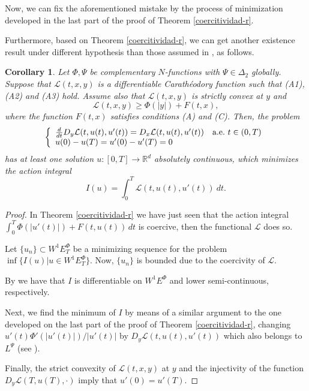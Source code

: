 \documentclass[twoside]{article}
\newtheorem{cor}[thm]{Corollary}
\theoremstyle{remark}
\newcommand{\lpsi}{L^{\Psi}}
\newcommand{\ephi}{E^{\Phi}}
\newcommand{\wphiet}{W^{1}\ephi_T}
\newcommand{\wphie}{W^{1}\ephi}
\newcommand{\rr}{\mathbb{R}}
\renewcommand{\geq}{\geqslant}
\begin{document}
Now, we can fix the aforementioned mistake by the process of minimization developed 
in the last part of the proof of Theorem \ref{coercitividad-r}.

Furthermore, based on Theorem \ref{coercitividad-r},
we can get another existence result under different hypothesis  than those assumed in \cite[Thm. 6.2]{ABGMS2015}, as follows.


\begin{cor}
Let $\Phi,\Psi$ be complementary $N$-functions with $\Psi \in \Delta_2$ globally. 
Suppose that  $\mathcal{L}(t,x,y)$ is a differentiable Carath\'eodory function such that (A1),(A2) and (A3) hold. 
Assume also that $\mathcal{L}(t,x,y)$ is strictly convex at $y$ and 
\begin{equation}
\mathcal{L}(t,x,y) \geq \Phi\left(|y|\right)+ F(t,x),
\end{equation}
where the function $F(t,x)$ satisfies conditions (A) and (C).
Then, the problem
\begin{equation}\label{ProbPrin-gral}
    \left\{%
\begin{array}{ll}
  \frac{d}{dt} D_{y}\mathcal{L}(t,u(t),u'(t))= D_{x}\mathcal{L}(t,u(t),u'(t)) \quad \hbox{a.e.}\ t \in (0,T)\\
    u(0)-u(T)=u'(0)-u'(T)=0
\end{array}%
\right.
\end{equation}
has at least one solution $u:[0,T]\to\rr^d$ absolutely continuous, 
which minimizes the action integral
\begin{equation}\label{integral_accion}
I(u)=\int_{0}^T \mathcal{L}(t,u(t),u'(t))\ dt.
\end{equation}
\end{cor}


\begin{proof}
In Theorem \ref{coercitividad-r} we have just seen that the action integral 
$\int_0^T \Phi(|u'(t)|)+F(t,u(t))\,dt$
is coercive, then the functional $\mathcal L$ does so. 

Let $\{u_n\}\subset \wphiet$ be   a  minimizing sequence for the problem  $\inf\{I(u)|u\in\wphiet\}$.
Now, $\{u_n\}$ is bounded due to the coercivity of $\mathcal{L}$. 

By \cite[Thm. 3.2, Lemma 6.1]{ABGMS2015} we have that $I$ is differentiable on $\wphie$ and lower semi-continuous, respectively.

Next, we find the minimum of $I$ by means of a similar argument to the one developed 
on the last part of the proof of Theorem \ref{coercitividad-r}, 
changing  $u'(t)\Phi'(|u'(t)|)/|u'(t)|$ by $D_{y}\mathcal{L}(t,u(t),u'(t))$  which also belongs to $\lpsi$  
(see \cite[Eq. (26)]{ABGMS2015}). 

Finally, the strict convexity of $\mathcal{L}(t,x,y)$ at $y$ and the injectivity of 
the function $D_y\mathcal{L}(T,u(T),\cdot)$ imply that $u'(0)=u'(T)$.
\end{proof}
\end{document}
